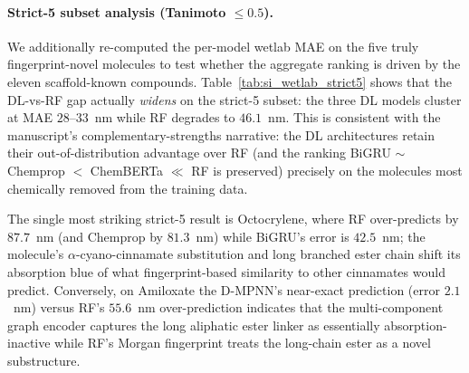 \documentclass[journal=jcisd8,manuscript=suppinfo]{achemso}
\begin{document}
\paragraph{Strict-5 subset analysis (Tanimoto $\leq 0.5$).}
We additionally re-computed the per-model wetlab MAE on the five truly fingerprint-novel molecules to test whether the aggregate ranking is driven by the eleven scaffold-known compounds. Table~\ref{tab:si_wetlab_strict5} shows that the DL-vs-RF gap actually \emph{widens} on the strict-5 subset: the three DL models cluster at MAE $28$--$33$~nm while RF degrades to $46.1$~nm. This is consistent with the manuscript's complementary-strengths narrative: the DL architectures retain their out-of-distribution advantage over RF (and the ranking BiGRU $\sim$ Chemprop $<$ ChemBERTa $\ll$ RF is preserved) precisely on the molecules most chemically removed from the training data.

\begin{table}[htbp]
\centering
\caption{Per-model wetlab MAE (nm) on three nested subsets defined by Tanimoto similarity to the v3 training set: the full aggregate (16 molecules), the scaffold-known 11 (excluding Ferulic Acid and the five with Tanimoto $\leq 0.5$), and the strict-5 subset of truly fingerprint-novel molecules. Each subset row aggregates over the EtOH and MeOH measurements.}
\label{tab:si_wetlab_strict5}
\small
{}
\end{table}

The single most striking strict-5 result is Octocrylene, where RF over-predicts by $87.7$~nm (and Chemprop by $81.3$~nm) while BiGRU's error is $42.5$~nm; the molecule's $\alpha$-cyano-cinnamate substitution and long branched ester chain shift its absorption blue of what fingerprint-based similarity to other cinnamates would predict. Conversely, on Amiloxate the D-MPNN's near-exact prediction (error $2.1$~nm) versus RF's $55.6$~nm over-prediction indicates that the multi-component graph encoder captures the long aliphatic ester linker as essentially absorption-inactive while RF's Morgan fingerprint treats the long-chain ester as a novel substructure.
\end{document}
